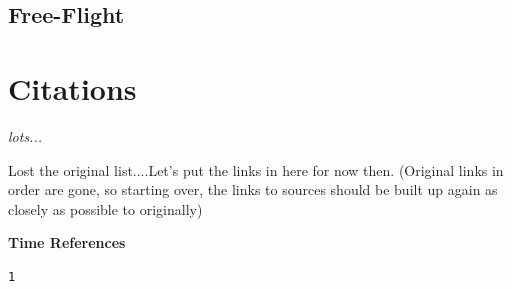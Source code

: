 \documentclass[11pt,dvipsnames]{thesis}
\begin{document}
\section{Free-Flight}



\chapter*{Citations}
\textit{lots...}

Lost the original list....Let's put the links in here for now then. (Original links in order are gone, so starting over, the links to sources should be built up again as closely as possible to originally)

{\centering\textbf{\Large Time References}}
\begin{verbatim}
1
\end{verbatim}
\end{document}
